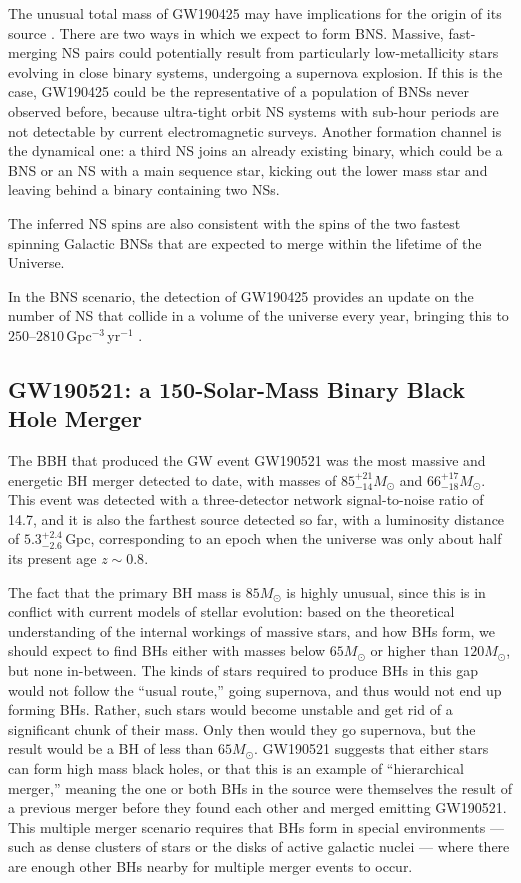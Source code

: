 \documentclass[binding=0.6cm, LaM]{sapthesis}
\begin{document}
	The unusual total mass of GW190425 may have implications for the origin of its source \cite{175}.
	There are two ways in which we expect to form BNS. 
	Massive, fast-merging NS pairs could potentially result from 
	particularly low-metallicity stars evolving in close binary systems, undergoing a supernova explosion.
	If this is the case, GW190425 could be the representative of a population of BNSs never observed before, 
	because ultra-tight orbit NS systems with sub-hour periods are not detectable by current electromagnetic surveys.
	Another formation channel is the dynamical one: a third NS joins an already existing binary, 
	which could be a BNS or an NS with a main sequence star, kicking out the
	lower mass star and leaving behind a binary containing two NSs.

	The inferred NS spins are also consistent with the spins of the two fastest 
	spinning Galactic BNSs that are expected to merge within the lifetime of the Universe.

	In the BNS scenario, the detection of GW190425 provides an update 
	on the number of NS that collide in a volume of the universe every year, bringing this to $250$--$2810\,$Gpc$^{-3}\,$yr$^{-1}$ \cite{62}.

\subsection{GW190521: a 150-Solar-Mass Binary Black Hole Merger}
	The BBH that produced the GW event GW190521 was the most massive and energetic BH merger detected to date, 
	with masses of $85^{+21}_{-14}M_{\odot}$ and  $66^{+17}_{-18}M_{\odot}$.
	This event was detected with a three-detector network signal-to-noise ratio of 14.7, 
	and it is also the farthest source detected so far, with a luminosity distance of $5.3^{+2.4}_{-2.6}\,$Gpc,
	corresponding to an epoch when the universe was only about half its present age $z \sim 0.8$.

	The fact that the primary BH mass is $85 M_{\odot}$ is highly unusual, 
	since this is in conflict with current models of stellar evolution:
	based on the theoretical understanding of the internal workings of massive stars, 
	and how BHs form, we should expect to find BHs
	either with masses below $65M_\odot$ or higher than $120M_{\odot}$, but none in-between.
	The kinds of stars required to produce BHs in this gap would not follow the ``usual route,''
	going supernova, and thus would not end up forming BHs. 
	Rather, such stars would become unstable and get rid of a significant chunk of their mass. 
	Only then would they go supernova, but the result would be a BH of less than $65 M_\odot$.
	GW190521 suggests that either stars can form high mass black holes, 
	or that this is an example of ``hierarchical merger,'' 
	meaning the one or both BHs in the source were themselves the result of 
	a previous merger before they found each other and merged emitting GW190521.
	This multiple merger scenario requires that BHs form in special environments
        --- such as dense clusters of stars or the disks of active galactic nuclei --- 
	where there are enough other BHs nearby for multiple merger events to occur.
\end{document}
